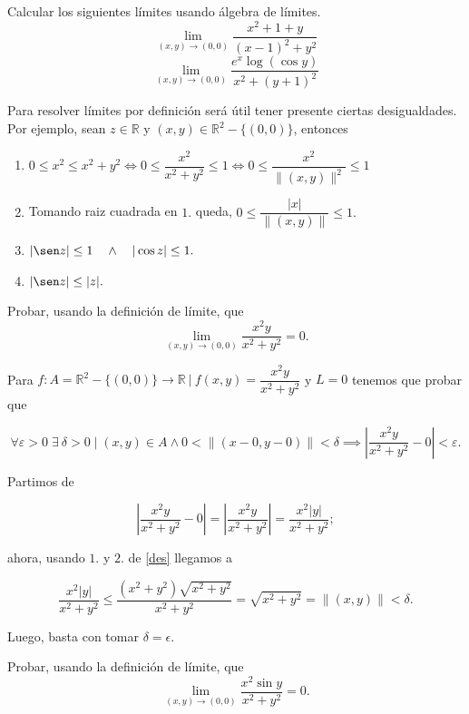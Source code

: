 \begin{tarea}  Calcular los siguientes l\'imites usando \'algebra de l\'imites.
 \[
  \lim_{(x,y) \to (0,0)} \frac{x^2 +1 +  y}{(x-1)^2 +  y^2} 
 \]
 \[
  \lim_{(x,y) \to (0,0)} \frac{e^x \log(\cos y)}{x^2 + (y+1)^2}
 \]
\end{tarea}

\begin{obs} \label{des} Para resolver límites por definici\'on ser\'a \'util tener presente ciertas desigualdades. Por ejemplo, sean $z \in \mathbb{R}$  y $(x,y) \in \mathbb{R}^{2}-\{ (0,0) \}$, entonces
\begin{enumerate}
\item  $ 0\leq x^2\leq x^2+y^2 \iff  0\leq  \dfrac{ x^2}{ x^2+y^2}\leq 1 \iff  0\leq  \dfrac{x^2}{\|(x,y)\|^2}\leq 1$ 
  
\item Tomando raiz cuadrada en $1.$ queda,  \; $  0\leq \dfrac{|x|}{\|(x,y)\|}\leq 1.$
  
\item     $|\sen z|\leq 1  \quad\land\quad  |\cos z|\leq 1.$ 
 
\item   $|\sen z|\leq |z|.$ 
\end{enumerate}
\end{obs}


\begin{example} Probar, usando la definici\'on de l\'imite,  que
 \[
  \lim_{(x,y) \to (0,0)} \frac{x^2  y}{x^2 + y^2} = 0.
 \]
 \end{example}

Para $f: A=\mathbb{R}^{2}-\{(0,0)\} \to \mathbb{R} \: | \: f(x,y)=\dfrac{x^2  y}{x^2 + y^2}$  \: y \: $L=0$ tenemos que probar que

\[
\forall \varepsilon > 0\; \exists\:\delta > 0 \;|\;    (x,y) \in A \land 0 < \|(x-0,y-0)\| < \delta \implies   \left| \frac{x^2y}{x^2+y^2} - 0\right|  <  \varepsilon.   
\]

Partimos de

\[
\left| \frac{x^2y}{x^2+y^2} - 0\right|=\left| \frac{x^2y}{x^2+y^2}\right|= \frac{x^2|y|}{x^2+y^2};
\]

ahora, usando  $1.$ y $2.$ de \ref{des} llegamos a 

\[
\frac{x^2|y|}{x^2+y^2}\leq\frac{(x^2+y^2)\sqrt{x^2+y^2} }{x^2+y^2}=\sqrt{x^2+y^2}=\|(x,y)\|<\delta.
\]

Luego, basta con tomar $\delta=\epsilon$.

\begin{example} Probar, usando la definici\'on de l\'imite, que
 \[
  \lim_{(x,y) \to (0,0)} \frac{x^2 \sin y}{x^2 + y^2} = 0.
 \]
\end{example}

